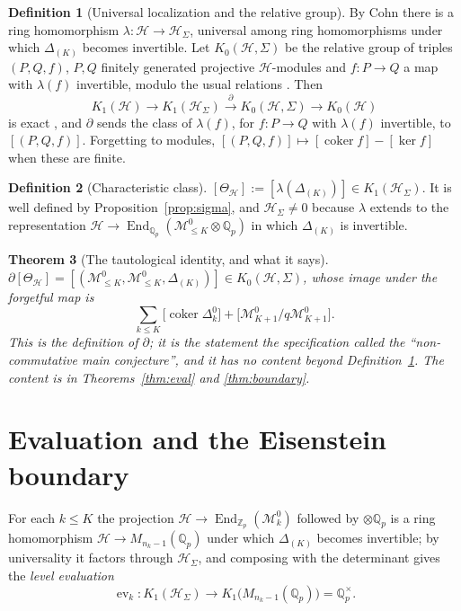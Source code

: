 \documentclass[11pt]{amsart}
\numberwithin{equation}{section}
\newtheorem{theorem}{Theorem}[section]
\theoremstyle{definition}
\newtheorem{definition}[theorem]{Definition}
\theoremstyle{remark}
\newcommand{\Z}{\mathbb{Z}}
\newcommand{\Q}{\mathbb{Q}}
\newcommand{\Zp}{\Z_p}
\newcommand{\Qp}{\Q_p}
\newcommand{\cH}{\mathcal{H}}
\newcommand{\cM}{\mathcal{M}}
\newcommand{\coker}{\operatorname{coker}}
\newcommand{\ev}{\operatorname{ev}}
\newcommand{\End}{\operatorname{End}}
\newcommand{\HS}{\cH_\Sigma}
\begin{document}
\begin{definition}[Universal localization and the relative group]\label{def:loc}
By Cohn \cite{Co} there is a ring homomorphism $\lambda\colon\cH\to\HS$, universal among ring
homomorphisms under which $\Delta_{(K)}$ becomes invertible. Let $K_0(\cH,\Sigma)$ be the
relative group of triples $(P,Q,f)$, $P,Q$ finitely generated projective $\cH$-modules and
$f\colon P\to Q$ a map with $\lambda(f)$ invertible, modulo the usual relations
\cite[Ch.~4]{Sch}. Then
\begin{equation}\label{eq:seq}
K_1(\cH)\longrightarrow K_1(\HS)\xrightarrow{\ \partial\ }K_0(\cH,\Sigma)\longrightarrow K_0(\cH)
\end{equation}
is exact \cite[Ch.~4]{Sch}, and $\partial$ sends the class of $\lambda(f)$, for
$f\colon P\to Q$ with $\lambda(f)$ invertible, to $[(P,Q,f)]$. Forgetting to modules,
$[(P,Q,f)]\mapsto[\coker f]-[\ker f]$ when these are finite.
\end{definition}

\begin{definition}[Characteristic class]\label{def:theta}
$[\Theta_{\cH}]:=[\lambda(\Delta_{(K)})]\in K_1(\HS)$. It is well defined by
Proposition~\ref{prop:sigma}, and $\HS\ne0$ because $\lambda$ extends to the representation
$\cH\to\End_{\Qp}(\cM^{0}_{\le K}\otimes\Qp)$ in which $\Delta_{(K)}$ is invertible.
\end{definition}

\begin{theorem}[The tautological identity, and what it says]\label{thm:tauto}
$\partial[\Theta_{\cH}]=[(\cM^{0}_{\le K},\cM^{0}_{\le K},\Delta_{(K)})]\in K_0(\cH,\Sigma)$, whose
image under the forgetful map is
\[
\sum_{k\le K}\bigl[\coker\Delta_k^{0}\bigr]+\bigl[\cM^{0}_{K+1}/q\cM^{0}_{K+1}\bigr].
\]
This is the definition of $\partial$; it is the statement the specification called the
``non-commutative main conjecture'', and it has no content beyond
Definition~\ref{def:loc}. The content is in Theorems~\ref{thm:eval} and \ref{thm:boundary}.
\end{theorem}

\section{Evaluation and the Eisenstein boundary}\label{sec:eval}

For each $k\le K$ the projection $\cH\to\End_{\Zp}(\cM^{0}_k)$ followed by
$\otimes\Qp$ is a ring homomorphism $\cH\to M_{n_k-1}(\Qp)$ under which $\Delta_{(K)}$ becomes
invertible; by universality it factors through $\HS$, and composing with the determinant
gives the \emph{level evaluation}
\[
\ev_k\colon K_1(\HS)\longrightarrow K_1\bigl(M_{n_k-1}(\Qp)\bigr)=\Qp^{\times}.
\]
\end{document}
